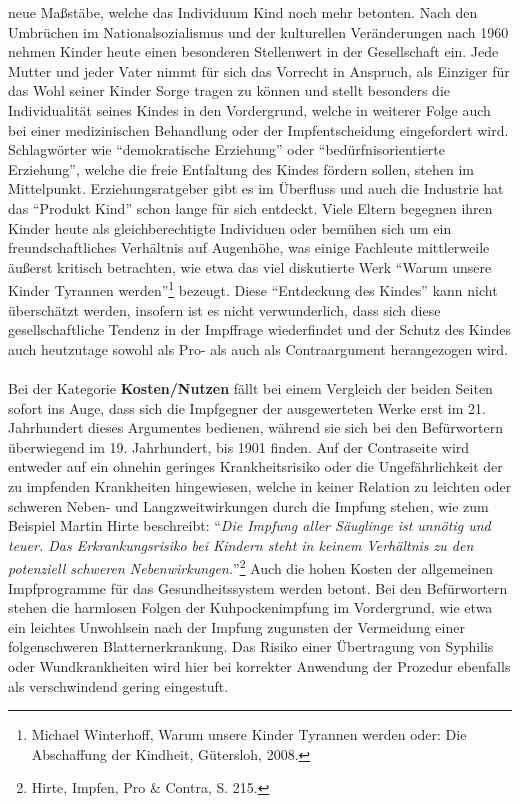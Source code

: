 \documentclass[
    a4paper,
    12pt,
    hyphens,
    chapterprefix=true,
    headheight=33pt,
    footheight=29pt,
    headings=optiontohead, %
]{scrartcl}
\begin{document}
{ neue Maßstäbe, welche das Individuum Kind noch mehr betonten. Nach den Umbrüchen im Nationalsozialismus und der kulturellen Veränderungen nach 1960 nehmen Kinder heute einen besonderen Stellenwert in der Gesellschaft ein. Jede Mutter und jeder Vater nimmt für sich das Vorrecht in Anspruch, als Einziger für das Wohl seiner Kinder Sorge tragen zu können und stellt besonders die Individualität seines Kindes in den Vordergrund, welche in weiterer Folge auch bei einer medizinischen Behandlung oder der Impfentscheidung eingefordert wird. Schlagwörter wie "`demokratische Erziehung"' oder "`bedürfnisorientierte Erziehung"', welche die freie Entfaltung des Kindes fördern sollen, stehen im Mittelpunkt. Erziehungsratgeber gibt es im Überfluss und auch die Industrie hat das "`Produkt Kind"' schon lange für sich entdeckt. Viele Eltern begegnen ihren Kinder heute als gleichberechtigte Individuen oder bemühen sich um ein freundschaftliches Verhältnis auf Augenhöhe, was einige Fachleute mittlerweile äußerst kritisch betrachten, wie etwa das viel diskutierte Werk "`Warum unsere Kinder Tyrannen werden"'\footnote{Michael Winterhoff, Warum unsere Kinder Tyrannen werden oder: Die Abschaffung der Kindheit, Gütersloh, 2008.} bezeugt. Diese "`Entdeckung des Kindes"' kann nicht überschätzt werden, insofern ist es nicht verwunderlich, dass sich diese gesellschaftliche Tendenz in der Impffrage wiederfindet und der Schutz des Kindes auch heutzutage sowohl als Pro- als auch als Contraargument herangezogen wird.\\
\\
Bei der Kategorie \textbf{Kosten/Nutzen} fällt bei einem Vergleich der beiden Seiten sofort ins Auge, dass sich die Impfgegner der ausgewerteten Werke erst im 21. Jahrhundert dieses Argumentes bedienen, während sie sich bei den Befürwortern überwiegend im 19. Jahrhundert, bis 1901 finden. Auf der Contraseite wird entweder auf ein ohnehin geringes Krankheitsrisiko oder die Ungefährlichkeit der zu impfenden Krankheiten hingewiesen, welche in keiner Relation zu leichten oder schweren Neben- und Langzweitwirkungen durch die Impfung stehen, wie zum Beispiel Martin Hirte beschreibt: "`\textit{Die Impfung aller Säuglinge ist unnötig und teuer. Das Erkrankungsrisiko bei Kindern steht in keinem Verhältnis zu den potenziell schweren Nebenwirkungen.}"'\footnote{Hirte, Impfen, Pro \& Contra, S. 215.}
 Auch die hohen Kosten der allgemeinen Impfprogramme für das Gesundheitssystem werden betont. Bei den Befürwortern stehen die harmlosen Folgen der Kuhpockenimpfung im Vordergrund, wie etwa ein leichtes Unwohlsein nach der Impfung zugunsten der Vermeidung einer folgenschweren Blatternerkrankung. Das Risiko einer Übertragung von Syphilis oder Wundkrankheiten wird hier bei korrekter Anwendung der Prozedur ebenfalls als verschwindend gering eingestuft. 
}
\end{document}
